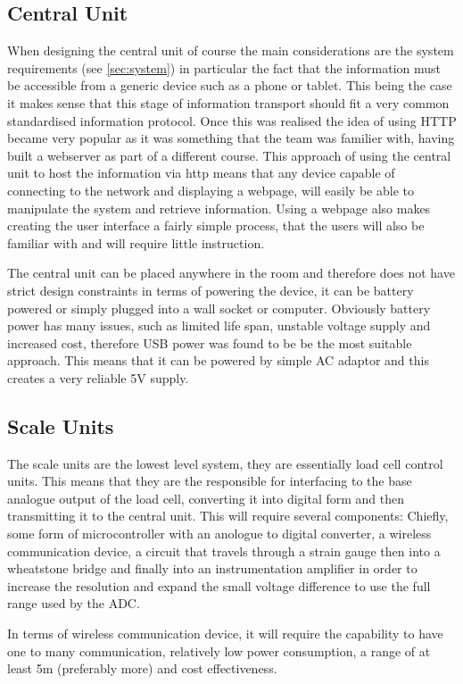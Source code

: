 \subsection{Central Unit}
\label{central_design}
When designing the central unit of course the main considerations are the system requirements (see \ref{sec:system}) in particular the fact that the information must be accessible from a generic device such as a phone or tablet. This being the case it makes sense that this stage of information transport should fit a very common standardised information protocol. Once this was realised the idea of using HTTP became very popular as it was something that the team was familier with, having built a webserver as part of a different course. This approach of using the central unit to host the information via http means that any device capable of connecting to the network and displaying a webpage, will easily be able to manipulate the system and retrieve information. Using a webpage also makes creating the user interface a fairly simple process, that the users will also be familiar with and will require little instruction. 

The central unit can be placed anywhere in the room and therefore does not have strict design constraints  in terms of powering the device, it can be battery powered or simply plugged into a wall socket or computer. Obviously battery power has many issues, such as limited life span, unstable voltage supply and increased cost, therefore USB power was found to be be the most suitable approach. This means that it can be powered by simple AC adaptor and this creates a very reliable 5V supply.

\subsection{Scale Units}
\label{scale_units}
The scale units are the lowest level system, they are essentially load cell control units. This means that they are the responsible for interfacing to the base analogue output of the load cell, converting it into digital form and then transmitting it to the central unit. This will require several components: Chiefly, some form of microcontroller with an anologue to digital converter, a wireless communication device, a circuit that travels through a strain gauge then into a wheatstone bridge and finally into an instrumentation amplifier in order to increase the resolution and expand the small voltage difference to use the full range used by the ADC. 

In terms of wireless communication device, it will require the capability to have one to many communication, relatively low power consumption, a range of at least 5m (preferably more) and cost effectiveness.

